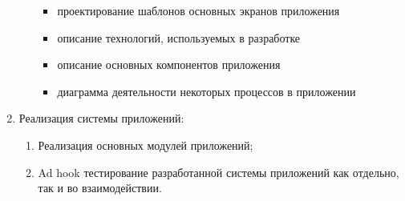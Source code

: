 \begin{enumerate}
\begin{enumerate}
\begin{itemize}
            \item проектирование шаблонов основных экранов приложения
            \item описание технологий, используемых в разработке
            \item описание основных компонентов приложения
            \item диаграмма деятельности некоторых процессов в приложении
        \end{itemize}
    \end{enumerate}
    \item Реализация системы приложений:
    \begin{enumerate}
        \item Реализация основных модулей приложений;
        \item Ad hook тестирование разработанной системы приложений как отдельно, так и во взаимодействии.
    \end{enumerate}
\end{enumerate}